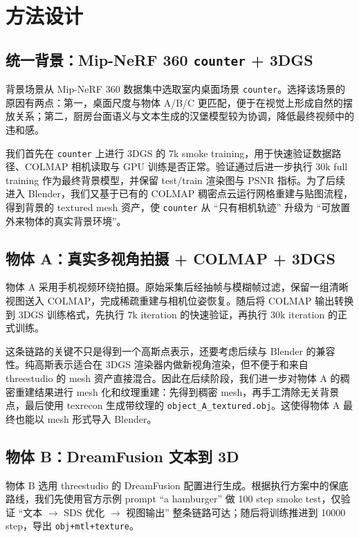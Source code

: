 \documentclass[UTF8,a4paper,11pt]{ctexart}
\begin{document}
\section{方法设计}

\subsection{统一背景：Mip-NeRF 360 \texttt{counter} + 3DGS}

背景场景从 Mip-NeRF 360 数据集中选取室内桌面场景 \texttt{counter}。选择该场景的原因有两点：第一，桌面尺度与物体 A/B/C 更匹配，便于在视觉上形成自然的摆放关系；第二，厨房台面语义与文本生成的汉堡模型较为协调，降低最终视频中的违和感。

我们首先在 \texttt{counter} 上进行 3DGS 的 7k smoke training，用于快速验证数据路径、COLMAP 相机读取与 GPU 训练是否正常。验证通过后进一步执行 30k full training 作为最终背景模型，并保留 test/train 渲染图与 PSNR 指标。为了后续进入 Blender，我们又基于已有的 COLMAP 稠密点云运行网格重建与贴图流程，得到背景的 textured mesh 资产，使 \texttt{counter} 从 ``只有相机轨迹'' 升级为 ``可放置外来物体的真实背景环境''。

\subsection{物体 A：真实多视角拍摄 + COLMAP + 3DGS}

物体 A 采用手机视频环绕拍摄。原始采集后经抽帧与模糊帧过滤，保留一组清晰视图送入 COLMAP，完成稀疏重建与相机位姿恢复。随后将 COLMAP 输出转换到 3DGS 训练格式，先执行 7k iteration 的快速验证，再执行 30k iteration 的正式训练。

这条链路的关键不只是得到一个高斯点表示，还要考虑后续与 Blender 的兼容性。纯高斯表示适合在 3DGS 渲染器内做新视角渲染，但不便于和来自 threestudio 的 mesh 资产直接混合。因此在后续阶段，我们进一步对物体 A 的稠密重建结果进行 mesh 化和纹理重建：先得到稠密 mesh，再手工清除无关背景点，最后使用 texrecon 生成带纹理的 \texttt{object\_A\_textured.obj}。这使得物体 A 最终也能以 mesh 形式导入 Blender。

\subsection{物体 B：DreamFusion 文本到 3D}

物体 B 选用 threestudio 的 DreamFusion 配置进行生成。根据执行方案中的保底路线，我们先使用官方示例 prompt ``a hamburger'' 做 100 step smoke test，仅验证 ``文本 $\rightarrow$ SDS 优化 $\rightarrow$ 视图输出'' 整条链路可达；随后将训练推进到 10000 step，导出 \texttt{obj+mtl+texture}。
\end{document}
